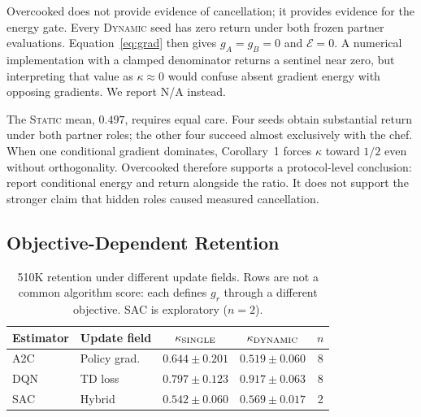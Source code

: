 \documentclass[letterpaper]{article}
\begin{document}
\begin{table}[t]
\centering
\small
\setlength{\tabcolsep}{3.5pt}
\caption{Overcooked PPO stress test over eight seeds.
Zero return makes the return-weighted gradients, and hence $\mathcal{E}$, zero in \textsc{Dynamic}; $\kappa$ is undefined.
Static averages include four seeds with substantial return under both partner roles.}
\label{tab:overcooked}
\end{table}

Overcooked does not provide evidence of cancellation; it provides evidence for the energy gate.
Every \textsc{Dynamic} seed has zero return under both frozen partner evaluations.
Equation~\eqref{eq:grad} then gives $g_A=g_B=0$ and $\mathcal{E}=0$.
A numerical implementation with a clamped denominator returns a sentinel near zero, but interpreting that value as $\kappa\approx0$ would confuse absent gradient energy with opposing gradients.
We report N/A instead.

The \textsc{Static} mean, $0.497$, requires equal care.
Four seeds obtain substantial return under both partner roles; the other four succeed almost exclusively with the chef.
When one conditional gradient dominates, Corollary~1 forces $\kappa$ toward $1/2$ even without orthogonality.
Overcooked therefore supports a protocol-level conclusion: report conditional energy and return alongside the ratio.
It does not support the stronger claim that hidden roles caused measured cancellation.

\subsection{Objective-Dependent Retention}
\label{sec:cross}

\begin{table}[t]
\centering
\small
\setlength{\tabcolsep}{3.5pt}
\begin{tabular}{llccc}
\toprule
Estimator & Update field & $\kappa_{\rm SINGLE}$ & $\kappa_{\rm DYNAMIC}$ & $n$ \\
\midrule
A2C & Policy grad. & $0.644\pm0.201$ & $0.519\pm0.060$ & 8 \\
DQN & TD loss      & $0.797\pm0.123$ & $0.917\pm0.063$ & 8 \\
SAC & Hybrid       & $0.542\pm0.060$ & $0.569\pm0.017$ & 2 \\
\bottomrule
\end{tabular}
\caption{510K retention under different update fields.
Rows are not a common algorithm score: each defines $g_r$ through a different objective.
SAC is exploratory ($n=2$).}
\label{tab:cross}
\end{table}
\end{document}
